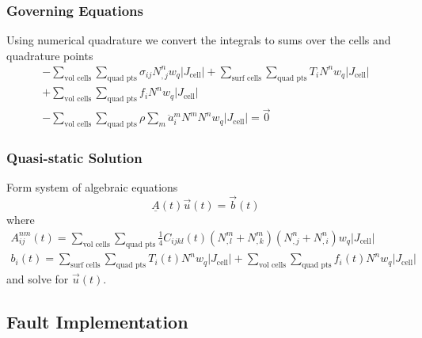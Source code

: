 \documentclass{beamer}
\begin{document}
\begin{frame}
  \frametitle{Governing Equations}
  \summary{}

  Using numerical quadrature we convert the integrals to sums over the
  cells and quadrature points
  \begin{multline}
    -\sum_\text{vol cells} \sum_\text{quad pts} \sigma_{ij} N^n_{,j} w_q |J_\text{cell}|
    + \sum_\text{surf cells} \sum_\text{quad pts} T_i N^n w_q |J_\text{cell}|\\
    + \sum_\text{vol cells} \sum_\text{quad pts}  f_i N^n w_q |J_\text{cell}|\\
    - \sum_\text{vol cells} \sum_\text{quad pts} \rho \sum_m \ddot{a}^m_i N^m N^n w_q |J_\text{cell}| = \vec{0}    
  \end{multline}

\end{frame}


\begin{frame}
  \frametitle{Quasi-static Solution}

  \vfill
  Form system of algebraic equations
  \begin{equation}
    \underline{A} (t) \vec{u}(t) = \vec{b}(t)
  \end{equation}
  where
  \begin{gather}
    A^{nm}_{ij}(t) = \sum_\text{vol cells} \sum_\text{quad pts} 
      \frac{1}{4} C_{ijkl}(t) (N^m_{,l} + N^m_{,k})(N^n_{,j} + N^n_{,i}) w_q |J_\text{cell}| \\
    b_i(t) =    
     \sum_\text{surf cells} \sum_\text{quad pts} T_i(t) N^n w_q |J_\text{cell}| 
    + \sum_\text{vol cells} \sum_\text{quad pts}  f_i(t) N^n w_q |J_\text{cell}|
\end{gather}
  and solve for $\vec{u}(t)$.
  \vfill


\end{frame}


\subsection{Fault Implementation}
\end{document}

